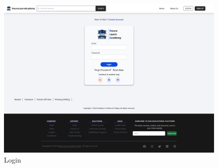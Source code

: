 \begin{figure}[h!]
	\centering
	\includegraphics[max height=\textheight,max width=\textwidth]{figures/frontend/login.png}
	\caption{Login}
\end{figure}

